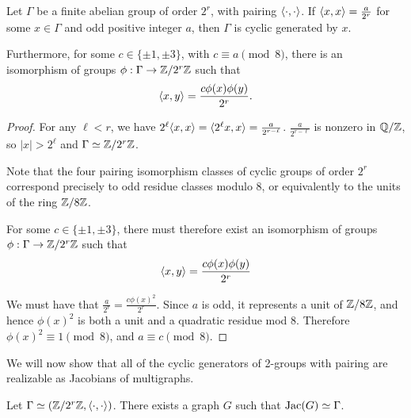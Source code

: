 \documentclass{amsart}
\begin{document}
\begin{lem}
  \label{lem:2group_pairing_mod8}
  Let $\Gamma$ be a finite abelian group of order $2^r$, with pairing
  $\langle \cdot, \cdot \rangle$. If $\langle x, x \rangle = \frac{a}{2^r}$ for some $x
  \in \Gamma$ and odd positive integer $a$, then $\Gamma$ is cyclic
  generated by $x$.

  Furthermore, for some $c \in \{\pm 1, \pm 3\}$, with $c \equiv a
  \pmod 8$, there is an isomorphism of groups $\phi:\Gamma \to
  \mathbb{Z}/2^r\mathbb{Z}$ such that
  \begin{equation*}
    \langle x, y \rangle = \frac{c\phi(x)\phi(y)}{2^r}.
  \end{equation*}
\end{lem}
\begin{proof}
  For any $\ell < r$, we have $2^\ell\langle x, x \rangle = \langle 2^\ell x, x \rangle
  = \frac{a}{2^{r - \ell}}$. $\frac{a}{2^{r-\ell}}$ is nonzero in
  $\mathbb{Q}/\mathbb{Z}$, so $|x| > 2^\ell$ and $\Gamma \simeq \mathbb{Z}/2^r\mathbb{Z}$.

  Note that the four pairing isomorphism classes of cyclic groups of
  order $2^r$ correspond precisely to odd residue classes modulo $8$,
  or equivalently to the units of the ring $\mathbb{Z}/8\mathbb{Z}$.

  For some $c \in \{\pm 1, \pm 3\}$, there must therefore exist an
  isomorphism of groups $\phi:\Gamma \to \mathbb{Z}/2^r\mathbb{Z}$ such that
  \begin{equation*}
    \langle x, y \rangle = \frac{c\phi(x)\phi(y)}{2^r}
  \end{equation*}

  We must have that $\frac{a}{2^r} = \frac{c\phi(x)^2}{2^r}$. Since
  $a$ is odd, it represents a unit of $\mathbb{Z}/8\mathbb{Z}$, and hence $\phi(x)^2$
  is both a unit and a quadratic residue mod $8$. Therefore $\phi(x)^2
  \equiv 1 \pmod 8$, and $a \equiv c \pmod 8$.
\end{proof}

We will now show that all of the cyclic generators of 2-groups with
pairing are realizable as Jacobians of multigraphs.

\begin{thm} Let $\Gamma \simeq (\mathbb{Z}/2^r\mathbb{Z},
  \langle \cdot, \cdot \rangle)$. There exists a graph $G$ such that $\operatorname{Jac}(G)
  \simeq \Gamma$. 
\end{thm}
\end{document}

